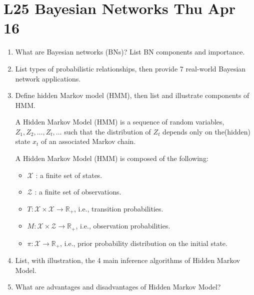 \documentclass[12pt]{article}
\newenvironment{QandA}{\begin{enumerate}[label=\bfseries\arabic*.]\bfseries}
{\end{enumerate}}
\newenvironment{answered}{\par\normalfont\color{Sepia}}{}
\begin{document}
\section*{L25 Bayesian Networks \textemdash{} Thu Apr 16}
\begin{QandA}
    \item What are Bayesian networks (BNs)? List BN components and importance.
    \begin{answered}
    \end{answered}

    \item List types of probabilistic relationships, then provide 7 real-world Bayesian network applications.
    \begin{answered}
    \end{answered}

    \item Define hidden Markov model (HMM), then list and illustrate components of HMM.
    \begin{answered}
        A Hidden Markov Model (HMM) is a sequence of random variables, $Z_1,Z_2,\ldots,Z_t,\ldots $ 
        such that the distribution of $Z_t$ depends only on the(hidden) state $x_t$ of an associated Markov chain.

        A Hidden Markov Model (HMM) is composed of the following:
        \begin{itemize}
            \item $\mathcal{X}$ : a finite set of states.
            \item $\mathcal{Z}$ : a finite set of observations.
            \item $T : \mathcal{X} \times \mathcal{X} \rightarrow \mathbb{R}_+$, i.e., transition probabilities.
            \item $M : \mathcal{X} \times \mathcal{Z} \rightarrow \mathbb{R}_+$, i.e., observation probabilities.
            \item $\pi : \mathcal{X} \rightarrow \mathbb{R}_+$, i.e., prior probability distribution on the initial state.
        \end{itemize}
    \end{answered}

    \item List, with illustration, the 4 main inference algorithms of Hidden Markov Model.
    \begin{answered}
    \end{answered}

    \item What are advantages and disadvantages of Hidden Markov Model?
    \begin{answered}

\end{answered}
\end{QandA}
\end{document}
